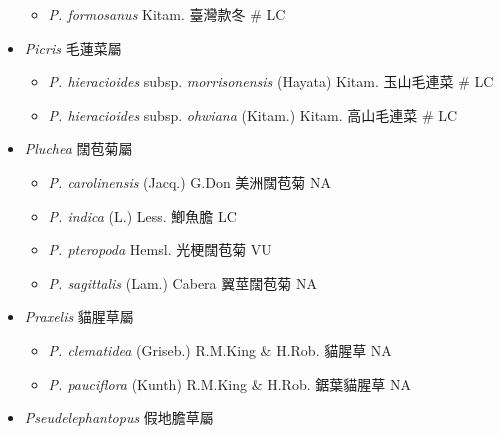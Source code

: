 \begin{itemize}
  \begin{itemize}
        \item[] \textit{P. formosanus} Kitam.  臺灣款冬  \# LC
  \end{itemize}
 \item[] \textit{Picris} 毛蓮菜屬
                                
  \begin{itemize}
        \item[] \textit{P. hieracioides} subsp. \textit{morrisonensis} (Hayata) Kitam.  玉山毛連菜  \# LC
        \item[] \textit{P. hieracioides} subsp. \textit{ohwiana} (Kitam.) Kitam.  高山毛連菜  \# LC
  \end{itemize}
 \item[] \textit{Pluchea} 闊苞菊屬
                                
  \begin{itemize}
        \item[] \textit{P. carolinensis} (Jacq.) G.Don  美洲闊苞菊   NA
        \item[] \textit{P. indica} (L.) Less.  鯽魚膽   LC
        \item[] \textit{P. pteropoda} Hemsl.  光梗闊苞菊   VU
        \item[] \textit{P. sagittalis} (Lam.) Cabera  翼莖闊苞菊   NA
  \end{itemize}
 \item[] \textit{Praxelis} 貓腥草屬
                                
  \begin{itemize}
        \item[] \textit{P. clematidea} (Griseb.) R.M.King \& H.Rob.  貓腥草   NA
        \item[] \textit{P. pauciflora} (Kunth) R.M.King \& H.Rob.  鋸葉貓腥草   NA
  \end{itemize}
 \item[] \textit{Pseudelephantopus} 假地膽草屬
                                

\end{itemize}
